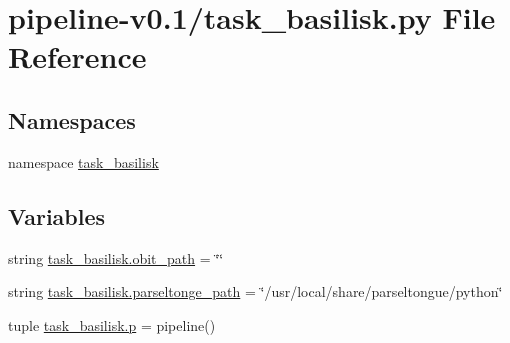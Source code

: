 \hypertarget{pipeline-v0_81_2task__basilisk_8py}{\section{pipeline-\/v0.1/task\-\_\-basilisk.py \-File \-Reference}
\label{pipeline-v0_81_2task__basilisk_8py}
}
\subsection*{\-Namespaces}
\begin{DoxyCompactItemize}
\item 
namespace \hyperlink{namespacetask__basilisk}{task\-\_\-basilisk}
\end{DoxyCompactItemize}
\subsection*{\-Variables}
\begin{DoxyCompactItemize}
\item 
string \hyperlink{namespacetask__basilisk_aed0c6d1cc698b489fcaf1af9b94d8654}{task\-\_\-basilisk.\-obit\-\_\-path} = \char`\"{}\char`\"{}
\item 
string \hyperlink{namespacetask__basilisk_a898b155fdd6a35d9738b02167102d6e0}{task\-\_\-basilisk.\-parseltonge\-\_\-path} = \char`\"{}/usr/local/share/parseltongue/python\char`\"{}
\item 
tuple \hyperlink{namespacetask__basilisk_a50730ce96c7f9275aecc19e75bf4a7bf}{task\-\_\-basilisk.\-p} = pipeline()
\end{DoxyCompactItemize}
